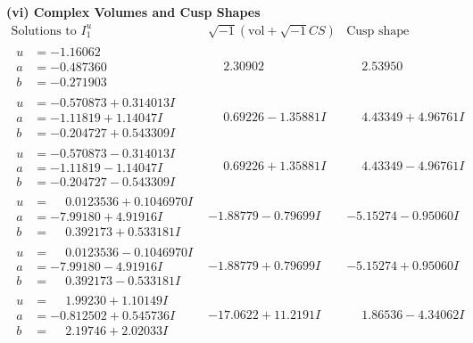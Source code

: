 \documentclass[1p]{elsarticle_modified}
\theoremstyle{definition}
\newcommand{\I}{\sqrt{-1}}
\begin{document}
\newpage\flushleft \textbf{(vi) Complex Volumes and Cusp Shapes}
$$\begin{array}{c|c|c}  
\text{Solutions to }I^u_{1}& \I (\text{vol} + \sqrt{-1}CS) & \text{Cusp shape}\\
 \hline 
\begin{aligned}
u &= -1.16062\phantom{ +0.000000I} \\
a &= -0.487360\phantom{ +0.000000I} \\
b &= -0.271903\phantom{ +0.000000I}\end{aligned}
 & \phantom{-}2.30902\phantom{ +0.000000I} & \phantom{-}2.53950\phantom{ +0.000000I} \\ \hline\begin{aligned}
u &= -0.570873 + 0.314013 I \\
a &= -1.11819 + 1.14047 I \\
b &= -0.204727 + 0.543309 I\end{aligned}
 & \phantom{-}0.69226 - 1.35881 I & \phantom{-}4.43349 + 4.96761 I \\ \hline\begin{aligned}
u &= -0.570873 - 0.314013 I \\
a &= -1.11819 - 1.14047 I \\
b &= -0.204727 - 0.543309 I\end{aligned}
 & \phantom{-}0.69226 + 1.35881 I & \phantom{-}4.43349 - 4.96761 I \\ \hline\begin{aligned}
u &= \phantom{-}0.0123536 + 0.1046970 I \\
a &= -7.99180 + 4.91916 I \\
b &= \phantom{-}0.392173 + 0.533181 I\end{aligned}
 & -1.88779 - 0.79699 I & -5.15274 - 0.95060 I \\ \hline\begin{aligned}
u &= \phantom{-}0.0123536 - 0.1046970 I \\
a &= -7.99180 - 4.91916 I \\
b &= \phantom{-}0.392173 - 0.533181 I\end{aligned}
 & -1.88779 + 0.79699 I & -5.15274 + 0.95060 I \\ \hline\begin{aligned}
u &= \phantom{-}1.99230 + 1.10149 I \\
a &= -0.812502 + 0.545736 I \\
b &= \phantom{-}2.19746 + 2.02033 I\end{aligned}
 & -17.0622 + 11.2191 I & \phantom{-}1.86536 - 4.34062 I \\ \hline\begin{aligned}

\end{aligned}
\end{array}$$
\end{document}
